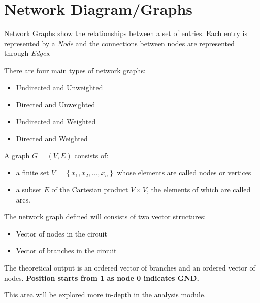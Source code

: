 \documentclass[a4paper, titlepage]{article}
\begin{document}
    \section{Network Diagram/Graphs}
    Network Graphs show the relationships between a set of entries. Each entry is represented by a \textit{Node} and the connections between nodes are represented through \textit{Edges}.
    \par
    There are four main types of network graphs:
    \begin{itemize}
        \item Undirected and Unweighted
        \item Directed and Unweighted
        \item Undirected and Weighted
        \item Directed and Weighted
    \end{itemize}
    \par
    A graph $G=(V, E)$ consists of: \cite{parse}  %
    \begin{itemize}
        \item a finite set $V = \left\{ x_1, x_2, \dots, x_n \right \}$ whose elements are called nodes or vertices %
        \item a subset $E$ of the Cartesian product $V \times V$, the elements of which are called arcs. %
    \end{itemize}
    The network graph defined will consists of two vector structures:
    \begin{itemize}
        \item Vector of nodes in the circuit
        \item Vector of branches in the circuit
    \end{itemize}
    The theoretical output is an ordered vector of branches and an ordered vector of nodes. 
    \textbf{Position starts from 1 as node 0 indicates GND.}
    \par
    This area will be explored more in-depth in the analysis module.
    \pagebreak
\end{document}
